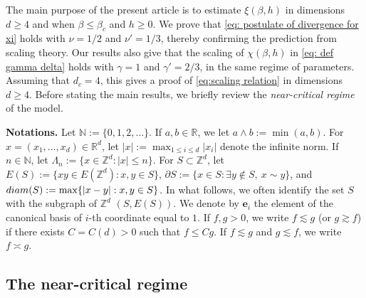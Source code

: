\documentclass[10pt,a4paper]{amsart}
\numberwithin{equation}{section}
\begin{document}
\vspace{4pt}

The main purpose of the present article is to estimate $\xi(\beta,h)$ in dimensions $d\geq 4$ and when $\beta\leq\beta_c$ and $h\geq 0$. We prove that \eqref{eq: postulate of divergence for xi} holds with $\nu=1/2$ and $\nu'=1/3$, thereby confirming the prediction from scaling theory. Our results also give that the scaling of $\chi(\beta,h)$ in \eqref{eq: def gamma delta} holds with $\gamma=1$ and $\gamma'=2/3$, in the same regime of parameters. Assuming that $d_c=4$, this gives a proof of \eqref{eq:scaling relation} in dimensions $d\geq 4$. Before stating the main results, we briefly review the \emph{near-critical regime} of the model.

\vspace{4pt}

\noindent\textbf{Notations.}
Let $\mathbb N:=\{0,1,2,\ldots\}$. If $a,b\in \mathbb R$, we let $a\wedge b:=\min(a,b)$. For $x=(x_1,\ldots,x_d)\in\mathbb R^d$, let $|x|:=\max_{1\leq i\leq d}|x_i|$ denote
the infinite norm. If $n\in \mathbb N$, let $\Lambda_n:=\{x\in \mathbb Z^d: |x|\leq n\}$. For $S\subset\mathbb Z^d$, let
$E(S):=\{xy\in E(\mathbb Z^d):x,y\in S\}$, $\partial S:=\{x\in S: \exists y\notin S, \: x\sim y\}$, and $\textup{diam}(S):=\max\{|x-y|: x,y\in S\}$. In what follows, we often identify the set $S$ with the subgraph of $\mathbb Z^d$ $(S,E(S))$. We denote by $\mathbf{e}_i$ the element of the canonical basis of $i$-th coordinate equal to $1$. If $f,g>0$, we write $f\lesssim g$ (or $g\gtrsim f$) if there exists $C=C(d)>0$ such that $f\leq Cg$. If $f\lesssim g$ and $g\lesssim f$, we write $f\asymp g$.

\subsection{The near-critical regime}
\end{document}
